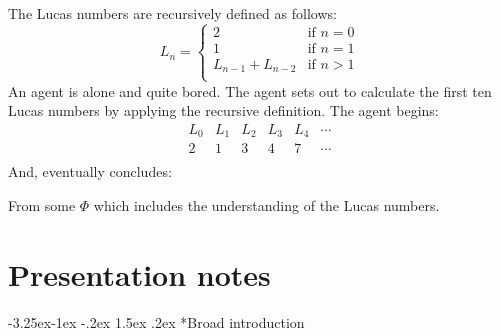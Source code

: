 \documentclass[10pt]{article}
\makeatletter
\renewcommand\paragraph{\@startsection{paragraph}{4}{\z@}%
  {-3.25ex\@plus -1ex \@minus -.2ex}%
  {1.5ex \@plus .2ex}%
  {\normalfont\normalsize\bfseries}}
\makeatother
\begin{document}
\begin{note}
    \begin{scenario}%
    \label{scen:LucasNums}%
    The Lucas numbers are recursively defined as follows:%
    \[
      L_{n} = \left\{
        \begin{array}{ll}
          2 & \text{if } n = 0 \\
          1 & \text{if } n = 1 \\
          L_{n-1} + L_{n-2} & \text{if } n > 1 \\
        \end{array}
      \right.
    \]
    An agent is alone and quite bored.
    The agent sets out to calculate the first ten Lucas numbers by applying the recursive definition.
    The agent begins:
    \[
      \begin{array}{cccccc}
        L_{0} & L_{1} & L_{2} & L_{3} & L_{4} & \cdots \\
        \hline
        2 & 1 & 3 & 4 & 7 & \cdots \\
      \end{array}
    \]
    And, eventually concludes:
    \begin{center}
    \end{center}
    From some \pool{} \(\Phi\) which includes the \agents{} understanding of the Lucas numbers.
  \end{scenario}
\end{note}



\newpage

\section*{Presentation notes}
\label{sec:presentation-notes}

\paragraph*{Broad introduction}
\end{document}
